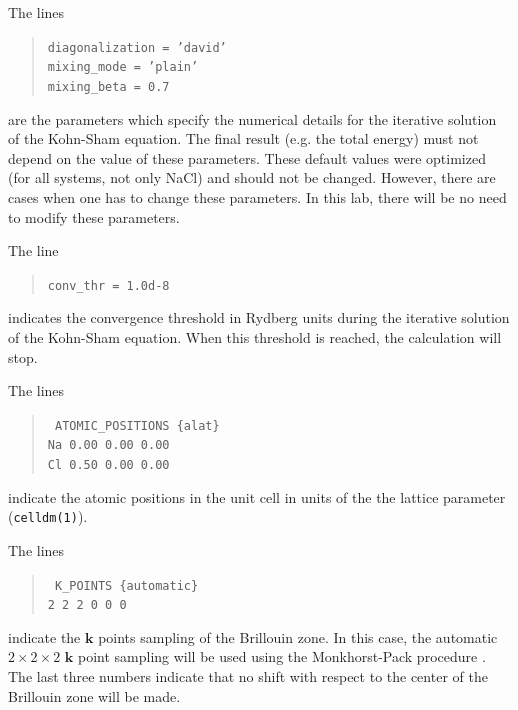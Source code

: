 \documentclass[12pt]{article}
\begin{document}
\begin{itemize}
        \item
          The lines
          \begin{quotation}
          \noindent
          {\tt diagonalization = 'david'}\\
          {\tt mixing\_mode = 'plain'}\\
          {\tt mixing\_beta = 0.7}\\
          \end{quotation}
          are the parameters which specify the numerical details for the iterative solution of the Kohn-Sham equation. The final result (e.g. the total energy) must not depend on the value of these parameters. These default values were optimized (for all systems, not only NaCl) and should not be changed. However, there are cases when one has to change these parameters. In this lab, there will be no need to modify these parameters.

        \item
          The line
          \begin{quotation}
          \noindent
          {\tt conv\_thr = 1.0d-8}
          \end{quotation}
          indicates the convergence threshold in Rydberg units during the iterative solution of the Kohn-Sham equation. When this threshold is reached, the calculation will stop.

        \begin{minipage}{\textwidth}
        \item
          The lines
          \begin{quotation}
          \noindent
          {\tt
          ATOMIC\_POSITIONS \{alat\}  \\
            Na 0.00 0.00 0.00 \\
            Cl 0.50 0.00 0.00
          }
          \end{quotation}
          indicate the atomic positions in the unit cell in units of the the lattice parameter ({\tt celldm(1)}).
        \end{minipage}

        \item
          The lines
          \begin{quotation}
          \noindent
          {\tt
          K\_POINTS \{automatic\} \\
           2 2 2 0 0 0
          }
          \end{quotation}
          indicate the $\mathbf{k}$ points sampling of the Brillouin zone. In this case, the automatic $2\times 2\times 2$ $\mathbf{k}$ point sampling will be used using the Monkhorst-Pack procedure \cite{Monkhorst1976special}. The last three numbers indicate that no shift with respect to the center of the Brillouin zone will be made.
      \end{itemize}
\end{document}
